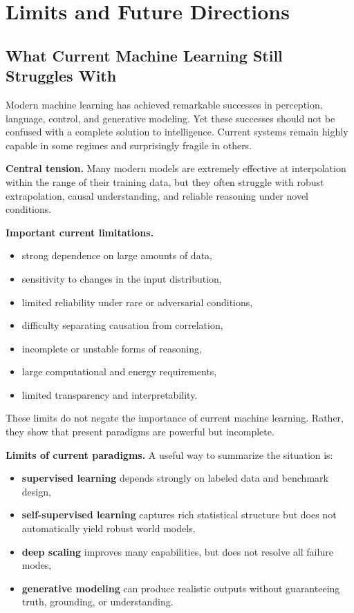 \chapter{Limits and Future Directions}

\section{What Current Machine Learning Still Struggles With}

Modern machine learning has achieved remarkable successes in perception, language, control, and generative modeling. Yet these successes should not be confused with a complete solution to intelligence. Current systems remain highly capable in some regimes and surprisingly fragile in others.

\medskip

\noindent
\textbf{Central tension.}
Many modern models are extremely effective at interpolation within the range of their training data, but they often struggle with robust extrapolation, causal understanding, and reliable reasoning under novel conditions.

\medskip

\noindent
\textbf{Important current limitations.}
\begin{itemize}
    \item strong dependence on large amounts of data,
    \item sensitivity to changes in the input distribution,
    \item limited reliability under rare or adversarial conditions,
    \item difficulty separating causation from correlation,
    \item incomplete or unstable forms of reasoning,
    \item large computational and energy requirements,
    \item limited transparency and interpretability.
\end{itemize}

\medskip

\noindent
These limits do not negate the importance of current machine learning. Rather, they show that present paradigms are powerful but incomplete.

\medskip

\noindent
\textbf{Limits of current paradigms.}
A useful way to summarize the situation is:
\begin{itemize}
    \item \textbf{supervised learning} depends strongly on labeled data and benchmark design,
    \item \textbf{self-supervised learning} captures rich statistical structure but does not automatically yield robust world models,
    \item \textbf{deep scaling} improves many capabilities, but does not resolve all failure modes,
    \item \textbf{generative modeling} can produce realistic outputs without guaranteeing truth, grounding, or understanding.
\end{itemize}

